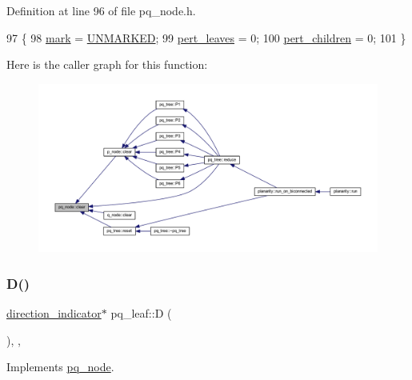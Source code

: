 Definition at line 96 of file pq\+\_\+node.\+h.


\begin{DoxyCode}
97     \{
98     \mbox{\hyperlink{classpq__node_aee913582a7b268ce2570bee8a8367c50}{mark}} = \mbox{\hyperlink{classpq__node_a6236b20cd5f6cc02cb5f637ed34c96d9a7fbe5f6a363f9f2b5a154c61b2389d59}{UNMARKED}};
99     \mbox{\hyperlink{classpq__node_a3fb78609f93f41efd6826ed3169fc312}{pert\_leaves}} = 0;
100     \mbox{\hyperlink{classpq__node_a8d8fb7b3059e7aeecf62eeed34076afb}{pert\_children}} = 0;
101     \}
\end{DoxyCode}
Here is the caller graph for this function\+:
\nopagebreak
\begin{figure}[H]
\begin{center}
\leavevmode
\includegraphics[width=350pt]{classpq__node_a13100e0b030cc047f382d9ddf6a44f4a_icgraph}
\end{center}
\end{figure}
\mbox{\label{classpq__leaf_a6abf6b0445fe1e5f906e3533d17d5eec}} 
\subsubsection{\texorpdfstring{D()}{D()}}
{\footnotesize\ttfamily \mbox{\hyperlink{classdirection__indicator}{direction\+\_\+indicator}}$\ast$ pq\+\_\+leaf\+::D (\begin{DoxyParamCaption}{ }\end{DoxyParamCaption})\hspace{0.3cm}{\ttfamily [inline]}, {\ttfamily [private]}, {\ttfamily [virtual]}}



Implements \mbox{\hyperlink{classpq__node_a5c85bd25c32bb6f18d6d8d1bfd35f260}{pq\+\_\+node}}.



